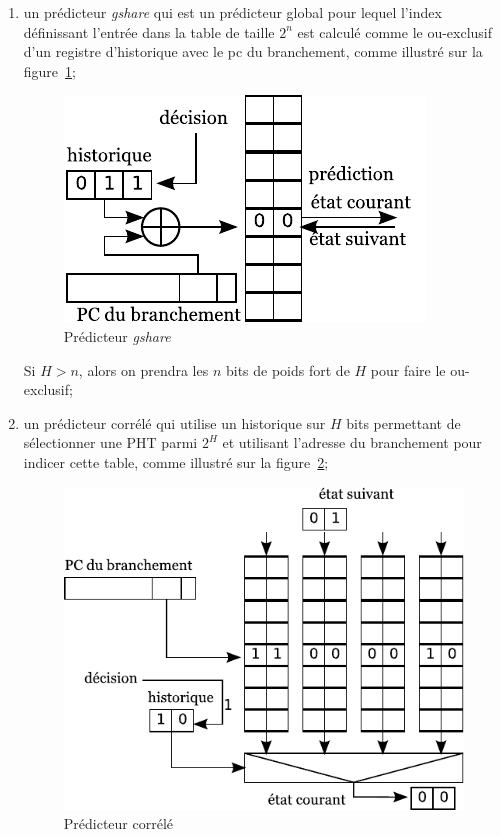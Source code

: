 \documentclass[a4paper]{article}
\begin{document}
\begin{enumerate}
\item un prédicteur \emph{gshare} qui est un prédicteur global pour lequel l'index définissant l'entrée dans la table de taille $2^n$ est calculé comme le ou-exclusif d'un registre d'historique avec le pc du branchement, comme illustré sur la figure~\ref{gshare};
      \begin{figure}[hbt]\center\leavevmode
      \includegraphics[scale=.9]{gshare}
      \caption{Prédicteur \emph{gshare}}
      \label{gshare}
      \end{figure}
      Si $H>n$, alors on prendra les $n$ bits de poids fort de $H$ pour faire le ou-exclusif;

\item un prédicteur corrélé qui utilise un historique sur $H$ bits permettant de sélectionner une PHT parmi $2^H$ et utilisant l'adresse du branchement pour indicer cette table, comme illustré sur la figure~\ref{correlated};
      \begin{figure}[hbt]\center\leavevmode
      \includegraphics[scale=.9]{correlated}
      \caption{\label{correlated}Prédicteur corrélé}
      \end{figure}


\end{enumerate}
\end{document}
